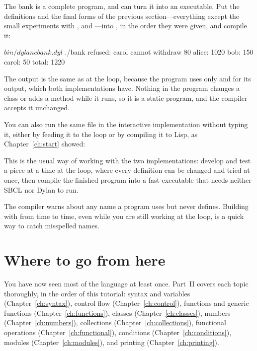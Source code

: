 The bank is a complete program, and  can turn it into an
executable. Put the definitions and the final forms of the previous
section---everything except the small experiments with ,
 and ---into , in the order they were
given, and compile it:

\begin{shell}
$ bin/dylanc bank.dyl
$ ./bank
refused: carol cannot withdraw 80
alice: 1020
bob: 150
carol: 50
total: 1220
\end{shell}

The output is the same as at the loop, because the program uses only
 and  for its output, which both
implementations have. Nothing in the program changes a class or adds a
method while it runs, so it is a static program, and the compiler accepts
it unchanged.

You can also run the same file in the interactive implementation without
typing it, either by feeding it to the loop or by compiling it to Lisp, as
Chapter~\ref{ch:start} showed:


This is the usual way of working with the two implementations: develop
and test a piece at a time at the loop, where every definition can be
changed and tried at once, then compile the finished program into a fast
executable that needs neither SBCL nor Dylan to run.

\begin{tipbox}
The compiler warns about any name a program uses but never defines.
Building with  from time to time, even while you are still
working at the loop, is a quick way to catch misspelled names.
\end{tipbox}

\section{Where to go from here}\label{sec:tut-next}

You have now seen most of the language at least once. Part~II covers each
topic thoroughly, in the order of this tutorial: syntax and variables
(Chapter~\ref{ch:syntax}), control flow (Chapter~\ref{ch:control}),
functions and generic functions (Chapter~\ref{ch:functions}), classes
(Chapter~\ref{ch:classes}), numbers (Chapter~\ref{ch:numbers}),
collections (Chapter~\ref{ch:collections}), functional operations
(Chapter~\ref{ch:functional}), conditions (Chapter~\ref{ch:conditions}),
modules (Chapter~\ref{ch:modules}), and printing
(Chapter~\ref{ch:printing}).

